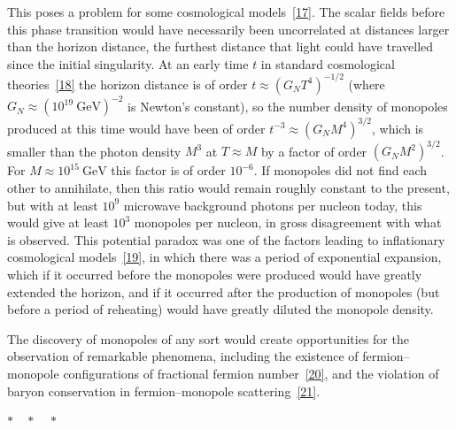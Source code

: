 This poses a problem for some cosmological
models~\hyperref[ch23-ref-17]{[17]}. The scalar fields before this phase
transition would have necessarily been uncorrelated at distances larger
than the horizon distance, the furthest distance that light could have
travelled since the initial singularity. At an early time $t$ in standard
cosmological theories~\hyperref[ch23-ref-18]{[18]} the horizon distance is
of order
$t\approx(G_NT^4)^{-1/2}$ (where
$G_N\approx(10^{19}\ \mathrm{GeV})^{-2}$ is Newton's constant), so the
number density of monopoles produced at this time would have been of
order $t^{-3}\approx(G_NM^4)^{3/2}$, which is smaller than the photon
density $M^3$ at $T\approx M$ by a factor of order $(G_NM^2)^{3/2}$. For
$M\approx10^{15}\ \mathrm{GeV}$ this factor is of order $10^{-6}$. If
monopoles did not find each other to annihilate, then this ratio would
remain roughly constant to the present, but with at least $10^9$ microwave
background photons per nucleon today, this would give at least $10^3$
monopoles per nucleon, in gross disagreement with what is observed. This
potential paradox was one of the factors leading to inflationary
cosmological models~\hyperref[ch23-ref-19]{[19]}, in which there was a
period of exponential expansion, which if it occurred before the
monopoles were produced would have greatly extended the horizon, and if
it occurred after the production of monopoles (but before a period of
reheating) would have greatly diluted the monopole density.

The discovery of monopoles of any sort would create opportunities for the
observation of remarkable phenomena, including the existence of
fermion--monopole configurations of fractional fermion
number~\hyperref[ch23-ref-20]{[20]}, and the violation of baryon
conservation in fermion--monopole
scattering~\hyperref[ch23-ref-21]{[21]}.

\begin{center}
$* \quad * \quad *$
\end{center}

